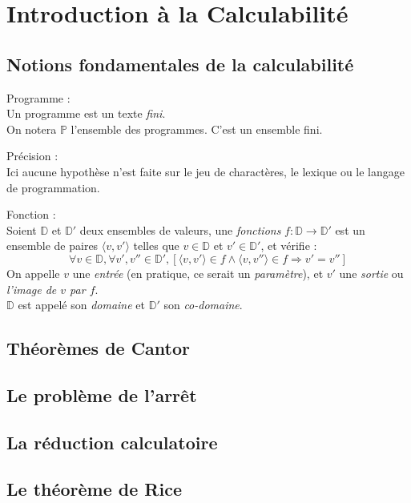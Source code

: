 \chapter{Introduction \`a la Calculabilit\'e}\label{chap:introduction}
    \section{Notions fondamentales de la calculabilit\'e}\label{sec:notions_fondamentales}
    \begin{definition}
        Programme :\\
        Un programme est un texte \emph{fini}.\\
        On notera \(\mathbb{P}\) l'ensemble des programmes. C'est un ensemble fini.\\
        \begin{Note}
            Précision :\\
            Ici aucune hypoth\`ese n'est faite sur le jeu de charact\`eres, le lexique ou le langage de programmation.
        \end{Note}
    \end{definition}
    \begin{definition}
        Fonction :\\
        Soient \(\mathbb{D}\) et \(\mathbb{D'}\) deux ensembles de valeurs, une \emph{fonctions} \(f:\mathbb{D}\rightarrow\mathbb{D'}\) est un ensemble de paires \(\langle v,v'\rangle\) telles que \(v\in\mathbb{D}\) et \(v'\in\mathbb{D'}\), et vérifie :
        \begin{equation}
            \forall v\in\mathbb{D}, \forall v',v''\in\mathbb{D'}, \left[\langle v,v'\rangle\in f\wedge\langle v,v''\rangle\in f \Rightarrow v'=v''\right]
        \end{equation}
        On appelle \(v\) une \emph{entrée} (en pratique, ce serait un \emph{paramètre}), et \(v'\) une \emph{sortie} ou \emph{l'image de \(v\) par \(f\)}.\\
        \(\mathbb{D}\) est appelé son \emph{domaine} et \(\mathbb{D'}\) son \emph{co-domaine}.
    \end{definition}
  
  \section{Th\'eor\`emes de Cantor}\label{sec:theoremes_cantor}
  
  
  \section{Le probl\`eme de l'arrêt}\label{sec:probleme_arret}
  
  
  \section{La r\'eduction calculatoire}\label{sec:reduction_calculatoire}
  
  
  \section{Le th\'eor\`eme de Rice}\label{sec:theoreme_rice}